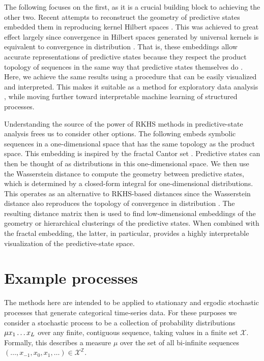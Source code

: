 \documentclass[draft,aps,pre,twocolumn,groupaddress,showkeys,nofootinbib,preprintnumbers,floatfix]{revtex4-2}
\begin{document}
The following focuses on the first, as it is a crucial building block to
achieving the other two. Recent attempts to reconstruct the geometry of
predictive states embedded them in reproducing kernel Hilbert spaces
\cite{Song09a,Song10a,Boot13a,Brod20a,Loom21a}. This was achieved to great
effect largely since convergence in Hilbert spaces generated by universal
kernels is equivalent to convergence in distribution \cite{Srip10a}. That is,
these embeddings allow accurate representations of predictive states because
they respect the product topology of sequences in the same way that predictive
states themselves do \cite{Loom21a}. Here, we achieve the same results using a
procedure that can be easily visualized and interpreted. This makes it suitable
as a method for exploratory data analysis \cite{Tuke62a,Tuke77a}, while moving
further toward interpretable machine learning of structured processes.

Understanding the source of the power of RKHS methods in predictive-state
analysis frees us to consider other options. The following embeds
symbolic sequences in a one-dimensional space that has the same topology as the
product space. This embedding is inspired by the fractal Cantor set
\cite{Kurk03a}. Predictive states can then be thought of as distributions in
this one-dimensional space. We then use the Wasserstein distance to compute the
geometry between predictive states, which is determined by a closed-form
integral for one-dimensional distributions. This operates as an alternative to
RKHS-based distances since the Wasserstein distance also reproduces the
topology of convergence in distribution \cite{Pane19a}. The resulting distance
matrix then is used to find low-dimensional embeddings \cite{Borg05a} of the
geometry or hierarchical clusterings \cite{Mull11a} of the predictive states.
When combined with the fractal embedding, the latter, in particular, provides a
highly interpretable visualization of the predictive-state space.

\section{Example processes}

The methods here are intended to be applied to stationary and ergodic
stochastic processes that generate categorical time-series data. For these
purposes we consider a stochastic process to be a collection of probability
distributions $\Prob{\mu}{x_1\dots x_L}$ over any finite, contiguous sequence,
taking values in a finite set $\mathcal{X}$. Formally, this describes a measure
$\mu$ over the set of all bi-infinite sequences $(\dots,x_{-1},x_0,x_1,\dots)
\in \mathcal{X}^{\mathbb{Z}}$.
\end{document}
